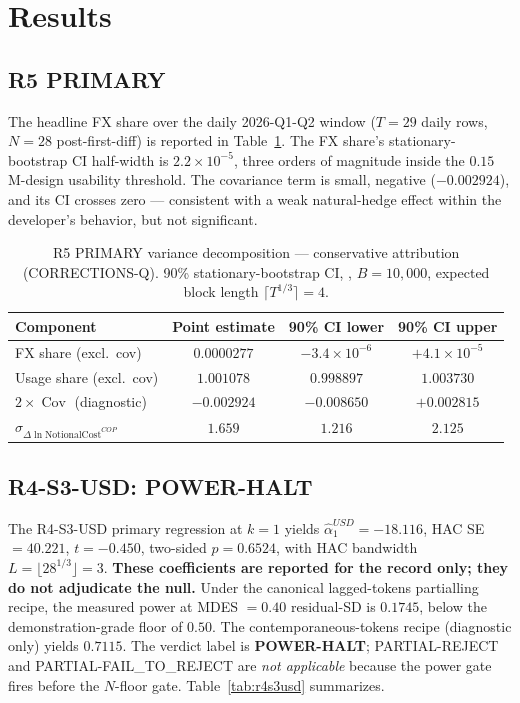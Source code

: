 \documentclass[11pt,letterpaper]{article}
\newcommand{\Cov}{\operatorname{Cov}}
\newcommand{\dln}{\Delta\ln}
\newcommand{\NotionalCop}{\text{NotionalCost}^{COP}}
\begin{document}
\section{Results}
\label{sec:results}

\subsection{R5 PRIMARY}

The headline FX share over the daily 2026-Q1-Q2 window
(\(T = 29\) daily rows, \(N = 28\) post-first-diff) is reported in
Table~\ref{tab:r5}. The FX share's stationary-bootstrap CI half-width
is \(2.2 \!\times\! 10^{-5}\), three orders of magnitude inside the
\(0.15\) M-design usability threshold. The covariance term is small,
negative (\(-0.002924\)), and its CI crosses zero --- consistent with
a weak natural-hedge effect within the developer's behavior, but not
significant.

\begin{table}[h]
\centering
\caption{R5 PRIMARY variance decomposition --- conservative attribution
  (CORRECTIONS-Q). 90\% stationary-bootstrap CI,
  \citet{PolitisRomano1994}, \(B = 10{,}000\), expected block length
  \(\lceil T^{1/3} \rceil = 4\).}
\label{tab:r5}
\begin{tabular}{lccc}
\toprule
Component & Point estimate & 90\% CI lower & 90\% CI upper \\
\midrule
FX share (excl.\ cov)              & \(0.0000277\)  & \(-3.4 \times 10^{-6}\) & \(+4.1 \times 10^{-5}\) \\
Usage share (excl.\ cov)           & \(1.001078\)   & \(0.998897\)            & \(1.003730\) \\
\(2 \times \Cov\) (diagnostic)     & \(-0.002924\)  & \(-0.008650\)           & \(+0.002815\) \\
\midrule
\(\hat\sigma_{\dln\NotionalCop}\)  & \(1.659\)      & \(1.216\)               & \(2.125\) \\
\bottomrule
\end{tabular}
\end{table}

\subsection{R4-S3-USD: POWER-HALT}

The R4-S3-USD primary regression at \(k=1\) yields
\(\hat\alpha_1^{USD} = -18.116\), HAC SE \(= 40.221\),
\(t = -0.450\), two-sided \(p = 0.6524\), with HAC bandwidth
\(L = \lfloor 28^{1/3} \rfloor = 3\). \textbf{These coefficients are
reported for the record only; they do not adjudicate the null.}
Under the canonical lagged-tokens partialling recipe, the measured
power at MDES \(= 0.40\) residual-SD is \(0.1745\), below the
demonstration-grade floor of \(0.50\). The contemporaneous-tokens
recipe (diagnostic only) yields \(0.7115\). The verdict label is
\textbf{POWER-HALT}; PARTIAL-REJECT and PARTIAL-FAIL\_TO\_REJECT are
\emph{not applicable} because the power gate fires before the
\(N\)-floor gate. Table~\ref{tab:r4s3usd} summarizes.
\end{document}
